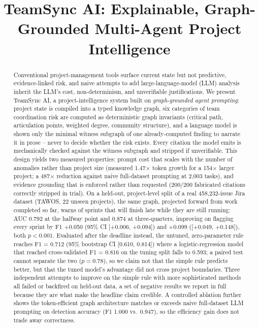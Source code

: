 \documentclass[conference]{IEEEtran}
\begin{document}
\title{TeamSync AI: Explainable, Graph-Grounded Multi-Agent Project Intelligence}

\author{
}

\maketitle

\begin{abstract}
Conventional project-management tools surface current state but not predictive,
evidence-linked risk, and naive attempts to add large-language-model (LLM) analysis
inherit the LLM's cost, non-determinism, and unverifiable justifications. We present
TeamSync AI, a project-intelligence system built on \emph{graph-grounded agent
prompting}: project state is compiled into a typed knowledge graph, six categories of
team coordination risk are computed as deterministic graph invariants (critical path,
articulation points, weighted degree, community structure), and a language model is
shown only the minimal witness subgraph of one already-computed finding to narrate it
in prose -- never to decide whether the risk exists. Every citation the model emits is
mechanically checked against the witness subgraph and stripped if unverifiable. This
design yields two measured properties: prompt cost that scales with the number of
anomalies rather than project size (measured 1.47$\times$ token growth for a
154$\times$ larger project; a 487$\times$ reduction against naive full-dataset
prompting at 2{,}003 tasks), and evidence grounding that is enforced rather than
requested (200/200 fabricated citations correctly stripped in trial). On a held-out,
project-level split of a real 458{,}232-issue Jira dataset (TAWOS, 22 unseen
projects), the same graph, projected forward from work completed so far, warns of
sprints that will finish late while they are still running: AUC 0.792 at the halfway
point and 0.874 at three-quarters, improving on flagging every sprint by F1 +0.050
(95\% CI [+0.006, +0.094]) and +0.099 ([+0.049, +0.148]), both $p < 0.001$. Evaluated
after the deadline instead, the untuned, zero-parameter rule reaches F1 = 0.712 (95\%
bootstrap CI [0.610, 0.814]) where a logistic-regression model that reached
cross-validated F1 = 0.816 on the tuning split falls to 0.593; a paired test cannot
separate the two ($p = 0.78$), so we claim not that the simple rule predicts better,
but that the tuned model's advantage did not cross project boundaries. Three
independent attempts to improve on the simple rule with more sophisticated methods all
failed or backfired on held-out data, a set of negative results we report in full
because they are what make the headline claim credible. A controlled ablation further shows the token-efficient graph architecture
matches or exceeds naive full-dataset LLM prompting on detection accuracy (F1 1.000
vs.\ 0.947), so the efficiency gain does not trade away correctness.
\end{abstract}
\end{document}
